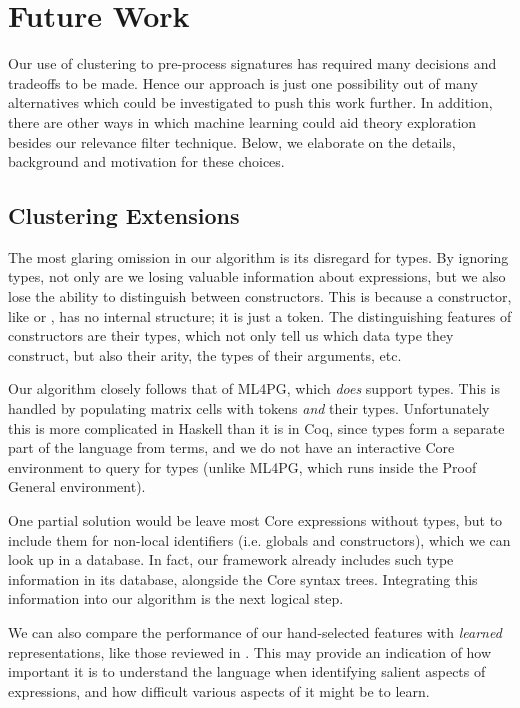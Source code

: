 \chapter{Future Work}
\label{sec:future}

Our use of clustering to pre-process \quickspec{} signatures has required many
decisions and tradeoffs to be made. Hence our approach is just one possibility
out of many alternatives which could be investigated to push this work
further. In addition, there are other ways in which machine learning could aid
theory exploration besides our relevance filter technique. Below, we elaborate
on the details, background and motivation for these choices.

\section{Clustering Extensions}
\label{sec:preprocessing}

The most glaring omission in our algorithm is its disregard for types. By
ignoring types, not only are we losing valuable information about expressions,
but we also lose the ability to distinguish between constructors. This is
because a constructor, like  or , has no internal structure;
it is just a token. The distinguishing features of constructors are their types,
which not only tell us which data type they construct, but also their arity, the
types of their arguments, etc.

Our algorithm closely follows that of ML4PG, which \emph{does} support
types. This is handled by populating matrix cells with tokens \emph{and} their
types. Unfortunately this is more complicated in Haskell than it is in Coq,
since types form a separate part of the language from terms, and we do not have
an interactive Core environment to query for types (unlike ML4PG, which runs
inside the Proof General environment).

One partial solution would be leave most Core expressions without types, but to
include them for non-local identifiers (i.e. globals and constructors), which we
can look up in a database. In fact, our \mlforhs{} framework already includes such
type information in its database, alongside the Core syntax trees. Integrating
this information into our algorithm is the next logical step.

We can also compare the performance of our hand-selected features with
\emph{learned} representations, like those reviewed in
\cite{bengio2013representation}. This may provide an indication of how
important it is to understand the language when identifying salient aspects of
expressions, and how difficult various aspects of it might be to learn.

